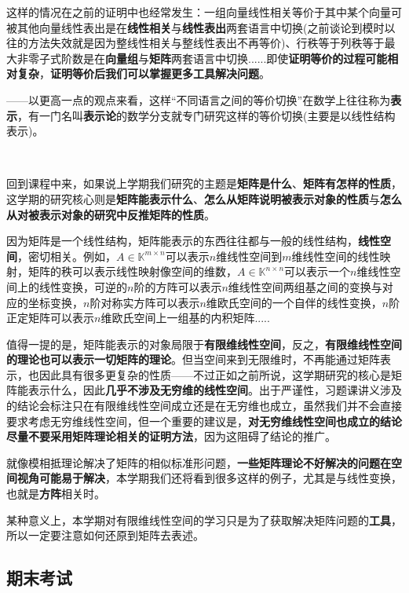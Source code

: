 \documentclass[a4paper,UTF8,fontset=windows,AutoFakeBold]{ctexart}
\newcommand*{\note}{\noindent *}
\begin{document}
这样的情况在之前的证明中也经常发生：一组向量线性相关等价于其中某个向量可被其他向量线性表出是在\textbf{线性相关}与\textbf{线性表出}两套语言中切换(之前谈论到模时以往的方法失效就是因为整线性相关与整线性表出不再等价)、行秩等于列秩等于最大非零子式阶数是在\textbf{向量组}与\textbf{矩阵}两套语言中切换......即使\textbf{证明等价的过程可能相对复杂}，\textbf{证明等价后我们可以掌握更多工具解决问题}。

——以更高一点的观点来看，这样``不同语言之间的等价切换''在数学上往往称为\textbf{表示}，有一门名叫\textbf{表示论}的数学分支就专门研究这样的等价切换(主要是以线性结构表示)。

\

回到课程中来，如果说上学期我们研究的主题是\textbf{矩阵是什么}、\textbf{矩阵有怎样的性质}，这学期的研究核心则是\textbf{矩阵能表示什么}、\textbf{怎么从矩阵说明被表示对象的性质}与\textbf{怎么从对被表示对象的研究中反推矩阵的性质}。

因为矩阵是一个线性结构，矩阵能表示的东西往往都与一般的线性结构，\textbf{线性空间}，密切相关。例如，$A\in\mathbb{K}^{m\times n}$可以表示$n$维线性空间到$m$维线性空间的线性映射，矩阵的秩可以表示线性映射像空间的维数，$A\in\mathbb{K}^{n\times n}$可以表示一个$n$维线性空间上的线性变换，可逆的$n$阶的方阵可以表示$n$维线性空间两组基之间的变换与对应的坐标变换，$n$阶对称实方阵可以表示$n$维欧氏空间的一个自伴的线性变换，$n$阶正定矩阵可以表示$n$维欧氏空间上一组基的内积矩阵.....

值得一提的是，矩阵能表示的对象局限于\textbf{有限维线性空间}，反之，\textbf{有限维线性空间的理论也可以表示一切矩阵的理论}。但当空间来到无限维时，不再能通过矩阵表示，也因此具有很多更复杂的性质——不过正如之前所说，这学期研究的核心是矩阵能表示什么，因此\textbf{几乎不涉及无穷维的线性空间}。出于严谨性，习题课讲义涉及的结论会标注只在有限维线性空间成立还是在无穷维也成立，虽然我们并不会直接要求考虑无穷维线性空间，但一个重要的建议是，\textbf{对无穷维线性空间也成立的结论尽量不要采用矩阵理论相关的证明方法}，因为这阻碍了结论的推广。

就像模相抵理论解决了矩阵的相似标准形问题，\textbf{一些矩阵理论不好解决的问题在空间视角可能易于解决}，本学期我们还将看到很多这样的例子，尤其是与线性变换，也就是\textbf{方阵}相关时。

\note 某种意义上，本学期对有限维线性空间的学习只是为了获取解决矩阵问题的\textbf{工具}，所以一定要注意如何还原到矩阵去表述。

\subsection{期末考试}
\end{document}
